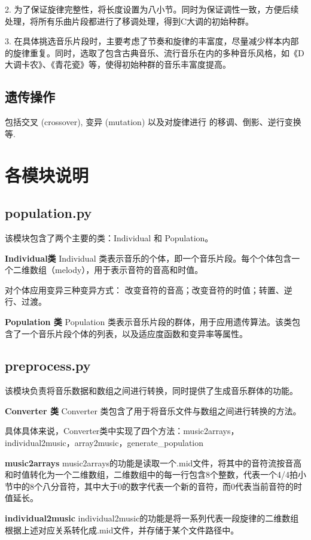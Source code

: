 \documentclass{article}
\begin{document}
2. 为了保证旋律完整性，将长度设置为八小节。同时为保证调性一致，方便后续处理，将所有乐曲片段都进行了移调处理，得到C大调的初始种群。

3. 在具体挑选音乐片段时，主要考虑了节奏和旋律的丰富度，尽量减少样本内部的旋律重复。同时，选取了包含古典音乐、流行音乐在内的多种音乐风格，如《D大调卡农》、《青花瓷》等，使得初始种群的音乐丰富度提高。

\subsection{遗传操作}
包括交叉 (crossover), 变异 (mutation) 以及对旋律进行
的移调、倒影、逆行变换等.

\section{各模块说明}
\subsection{population.py}
该模块包含了两个主要的类：Individual 和 Population。

\textbf{Individual类}
\quad Individual 类表示音乐的个体，即一个音乐片段。每个个体包含一个二维数组（melody），用于表示音符的音高和时值。

对个体应用变异三种变异方式：
改变音符的音高；改变音符的时值；转置、逆行、过渡。

\textbf{Population 类}
\quad Population 类表示音乐片段的群体，用于应用遗传算法。该类包含了一个音乐片段个体的列表，以及适应度函数和变异率等属性。


\subsection{preprocess.py}
该模块负责将音乐数据和数组之间进行转换，同时提供了生成音乐群体的功能。

\textbf{Converter 类}
\quad Converter 类包含了用于将音乐文件与数组之间进行转换的方法。

具体具体来说，Converter类中实现了四个方法：music2arrays，individual2music，array2music，generate\_population

\textbf{music2arrays}
\quad music2arrays的功能是读取一个.mid文件，将其中的音符流按音高和时值转化为一个二维数组，二维数组中的每一行包含8个整数，代表一个4/4拍小节中的8个八分音符，其中大于0的数字代表一个新的音符，而0代表当前音符的时值延长。

\textbf{individual2music}
\quad individual2music的功能是将一系列代表一段旋律的二维数组根据上述对应关系转化成.mid文件，并存储于某个文件路径中。
\end{document}
